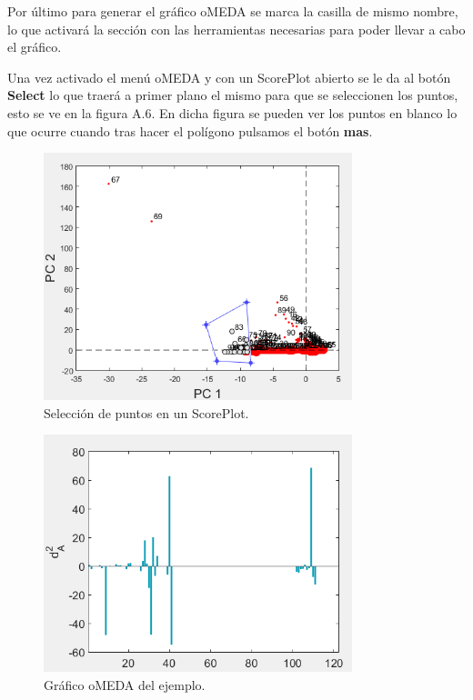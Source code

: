 \bigskip

Por último para generar el gráfico oMEDA se marca la casilla de mismo nombre, lo que activará la sección con las herramientas necesarias para poder llevar a cabo el gráfico.

\bigskip

Una vez activado el menú oMEDA y con un ScorePlot abierto se le da al botón \textbf{Select} lo que traerá a primer plano el mismo para que se seleccionen los puntos, esto se ve en la figura A.6. En dicha figura se pueden ver los puntos en blanco lo que ocurre cuando tras hacer el polígono pulsamos el botón \textbf{mas}.

\begin{figure}
\centering
\includegraphics[width=0.8\textwidth]{imagenes/figuras/MU-6.png}
\caption{Selección de puntos en un ScorePlot.}
\end{figure}

\begin{figure}[H]
\centering
\includegraphics[width=0.8\textwidth]{imagenes/figuras/MU-7.png}
\caption{Gráfico oMEDA del ejemplo.}
\end{figure}

